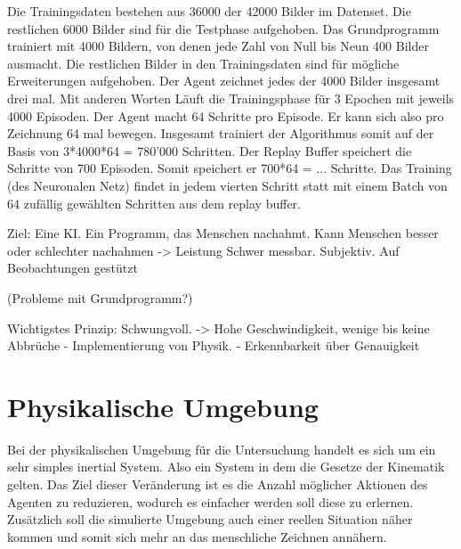 Die Trainingsdaten bestehen aus 36000 der 42000 Bilder im Datenset. Die
restlichen 6000 Bilder sind für die Testphase aufgehoben. Das Grundprogramm
trainiert mit 4000 Bildern, von denen jede Zahl von Null bis Neun 400 Bilder
ausmacht. Die restlichen Bilder in den Trainingsdaten sind für mögliche
Erweiterungen aufgehoben. Der Agent zeichnet jedes der 4000 Bilder insgesamt
drei mal. Mit anderen Worten Läuft die Trainingsphase für 3 Epochen mit jeweils
4000 Episoden. Der Agent macht 64 Schritte pro Episode. Er kann sich also pro
Zeichnung 64 mal bewegen. Insgesamt trainiert der Algorithmus somit auf der
Basis von 3*4000*64 = 780'000 Schritten. Der Replay Buffer speichert die
Schritte von 700 Episoden. Somit speichert er 700*64 = ... Schritte. Das
Training (des Neuronalen Netz) findet in jedem vierten Schritt statt mit einem
Batch von 64 zufällig gewählten Schritten aus dem replay buffer. 












Ziel: Eine KI. Ein Programm, das Menschen nachahmt. 
Kann Menschen besser oder schlechter nachahmen -> Leistung
Schwer messbar. Subjektiv. Auf Beobachtungen gestützt

    (Probleme mit Grundprogramm?)
    
    Wichtigstes Prinzip: Schwungvoll. -> Hohe Geschwindigkeit, wenige bis keine Abbrüche
        - Implementierung von Physik. 
        - Erkennbarkeit über Genauigkeit


\section{Physikalische Umgebung}
Bei der physikalischen Umgebung für die Untersuchung handelt es sich um ein sehr
simples inertial System. Also ein System in dem die Gesetze der Kinematik
gelten. Das Ziel dieser Veränderung ist es die Anzahl möglicher Aktionen des
Agenten zu reduzieren, wodurch es einfacher werden soll diese zu erlernen.
Zusätzlich soll die simulierte Umgebung auch einer reellen Situation näher
kommen und somit sich mehr an das menschliche Zeichnen annähern.

